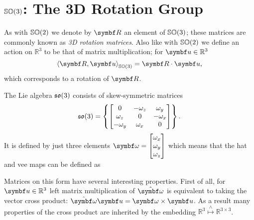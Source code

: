\chapter{\texorpdfstring{${\mathbb{SO}(3)}$}{SO(3)}: The 3D Rotation Group} As with ${\mathbb{SO}(2)}$ we denote by $\bR$ an element of ${\mathbb{SO}(3)}$; these matrices are commonly known as \emph{3D rotation matrices}. Also like with ${\mathbb{SO}(2)}$ we define an action on $\mathbb{R}^3$ to be that of  matrix multiplication; for $\bu \in \mathbb{R}^3$
\begin{equation}
  \left \langle \bR, \bu \right \rangle_\SOthree = \bR \cdot \bu,
\end{equation}
which corresponds to a rotation of $\bR$.

The Lie algebra ${\mathfrak{so}(3)}$ consists of skew-symmetric matrices
\begin{equation}
  {\mathfrak{so}(3)} = \left\{ \begin{bmatrix} 0 & -\omega_z & \omega_y \\ \omega_z & 0 & -\omega_x \\ -\omega_y & \omega_x & 0 \end{bmatrix} \right\}.
\end{equation}
It is defined by just three elements $\bomega = \begin{bmatrix} \omega_x \\ \omega_y \\ \omega_z \end{bmatrix}$ which means that the hat and vee maps can be defined as
\begin{center}
\end{center}
Matrices on this form have several interesting properties. First of all, for $\bu \in \mathbb{R}^3$ left matrix multiplication of $\hat {\bomega}$ is equivalent to taking the vector cross product: $\hat {\bomega} \bu = \bomega \times \bu$.  As a result many properties of the cross product are inherited by the embedding $\mathbb{R}^3 \overset{\wedge}\mapsto \mathbb{R}^{3 \times 3}$.

